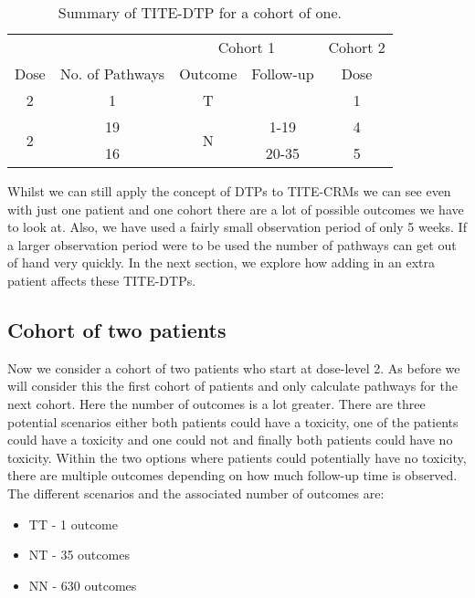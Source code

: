 \begin{table}[H]
	\centering
	\caption{Summary of TITE-DTP for a cohort of one.}
	\label{tab_tite-dtp:TITEDTP_c1_Sum}
	\begin{tabular}{ccccc}
		\hline
		\multicolumn{1}{l}{} &                 & \multicolumn{2}{c}{Cohort 1}   & Cohort 2 \\ 
		\cmidrule(l{3pt}r{3pt}){3-4} \cmidrule(l{3pt}r{3pt}){5-5}
		Dose                 & No. of Pathways & Outcome            & Follow-up & Dose     \\ \hline
		2                    & 1               & T                  &           & 1        \\ \hline
		\multirow{2}{*}{2}   & 19              & \multirow{2}{*}{N} & 1-19      & 4        \\
		& 16              &                    & 20-35     & 5        \\ \hline
	\end{tabular}
\end{table}

Whilst we can still apply the concept of DTPs to TITE-CRMs we can see even with just one patient and one cohort there are a lot of possible outcomes we have to look at. Also, we have used a fairly small observation period of only 5 weeks. If a larger observation period were to be used the number of pathways can get out of hand very quickly. In the next section, we explore how adding in an extra patient affects these TITE-DTPs.  


\subsection{Cohort of two patients}
\label{tite-dtp:TITE-DTPs-c2}
Now we consider a cohort of two patients who start at dose-level 2. As before we will consider this the first cohort of patients and only calculate pathways for the next cohort. Here the number of outcomes is a lot greater. There are three potential scenarios either both patients could have a toxicity, one of the patients could have a toxicity and one could not and finally both patients could have no toxicity. Within the two options where patients could potentially have no toxicity, there are multiple outcomes depending on how much follow-up time is observed. The different scenarios and the associated number of outcomes are: 

\begin{itemize}
	\item TT - 1 outcome 
	\item NT - 35 outcomes 
	\item NN - 630 outcomes
\end{itemize}

